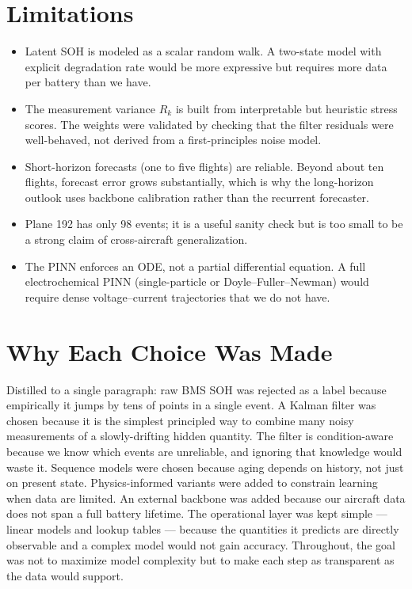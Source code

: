 \documentclass[11pt]{article}
\begin{document}
\section{Limitations}

\begin{itemize}[leftmargin=*]
    \item Latent SOH is modeled as a scalar random walk. A two-state
    model with explicit degradation rate would be more expressive but
    requires more data per battery than we have.
    \item The measurement variance \(R_k\) is built from interpretable
    but heuristic stress scores. The weights were validated by checking
    that the filter residuals were well-behaved, not derived from a
    first-principles noise model.
    \item Short-horizon forecasts (one to five flights) are reliable.
    Beyond about ten flights, forecast error grows substantially, which
    is why the long-horizon outlook uses backbone calibration rather
    than the recurrent forecaster.
    \item Plane 192 has only 98 events; it is a useful sanity check but
    is too small to be a strong claim of cross-aircraft generalization.
    \item The PINN enforces an ODE, not a partial differential equation.
    A full electrochemical PINN (single-particle or Doyle--Fuller--Newman)
    would require dense voltage--current trajectories that we do not
    have.
\end{itemize}

\section{Why Each Choice Was Made}

Distilled to a single paragraph: raw BMS SOH was rejected as a label
because empirically it jumps by tens of points in a single event. A
Kalman filter was chosen because it is the simplest principled way to
combine many noisy measurements of a slowly-drifting hidden quantity.
The filter is condition-aware because we know which events are
unreliable, and ignoring that knowledge would waste it. Sequence models
were chosen because aging depends on history, not just on present
state. Physics-informed variants were added to constrain learning when
data are limited. An external backbone was added because our aircraft
data does not span a full battery lifetime. The operational layer was
kept simple --- linear models and lookup tables --- because the
quantities it predicts are directly observable and a complex model
would not gain accuracy. Throughout, the goal was not to maximize
model complexity but to make each step as transparent as the data
would support.
\end{document}
